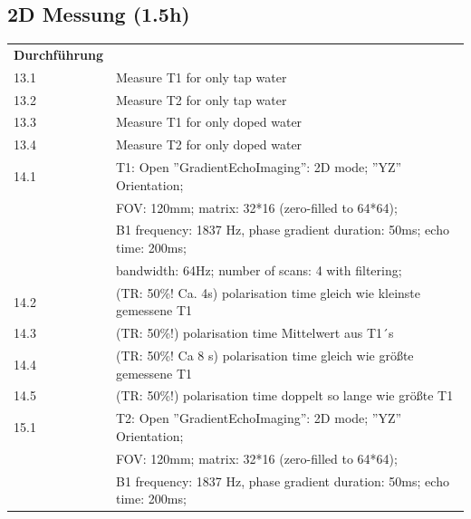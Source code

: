 \subsection{2D Messung (1.5h)}


\begin{tabular}{ll}
    \textbf{Durchführung} & \\

    13.1 & Measure T1 for only tap water \\

    13.2 & Measure T2 for only tap water \\

    13.3 & Measure T1 for only doped water \\

    13.4 & Measure T2 for only doped water \\

    14.1 & T1:  Open ''GradientEchoImaging'': 2D mode; ''YZ'' Orientation; \\

         &  FOV: 120mm; matrix: 32*16 (zero-filled to 64*64);  \\

         & B1 frequency: 1837 Hz, phase gradient duration: 50ms; echo time: 200ms;  \\

         &  bandwidth: 64Hz; number of scans: 4 with filtering; \\

    14.2 & (TR: 50\%! Ca. 4s) polarisation time gleich wie kleinste gemessene T1\\

    14.3 & (TR: 50\%!) polarisation time Mittelwert aus T1´s \\

    14.4 & (TR: 50\%! Ca 8 s) polarisation time gleich wie größte gemessene T1\\

    14.5 & (TR: 50\%!) polarisation time doppelt so lange wie größte T1\\

    15.1 & T2:  Open ''GradientEchoImaging'': 2D mode; ''YZ'' Orientation; \\

         &  FOV: 120mm; matrix: 32*16 (zero-filled to 64*64);  \\

         & B1 frequency: 1837 Hz, phase gradient duration: 50ms; echo time: 200ms;  \\


\end{tabular}
